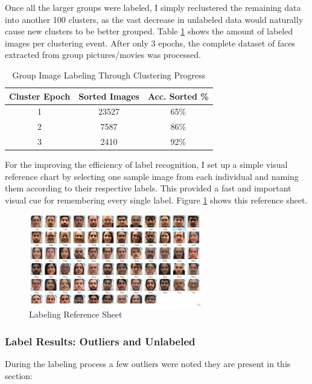 \documentclass[11pt]{article}
\begin{document}
        Once all the larger groups were labeled, I simply reclustered the remaining data into another 100 clusters, as the vast decrease in unlabeled data would naturally cause new clusters to be better grouped. Table \ref{table:cluster_passes} shows the amount of labeled images per clustering event. After only 3 epochs, the complete dataset of faces extracted from group pictures/movies was processed.

        \begin{table}[h!]
            \centering
            \begin{tabular}{||c c c||}
                \hline
                Cluster Epoch & Sorted Images & Acc. Sorted \% \\ [0.5ex]
                \hline\hline
                1 & 23527 &  65\% \\
                \hline
                2 & 7587 &  86\% \\
                \hline
                3 & 2410 & 92\% \\
                \hline
           \end{tabular}
           \caption{Group Image Labeling Through Clustering Progress}
            \label{table:cluster_passes}
        \end{table}

        For the improving the efficiency of label recognition, I set up a simple visual reference chart by selecting one sample image from each individual and naming them according to their respective labels. This provided a fast and important visual cue for remembering every single label. Figure \ref{fig:label:cheatsheet} shows this reference sheet.

        \begin{figure}[ht]
            \centering
            \includegraphics[height=4cm]{./Images/labeling/cheatsheet.png}
            \caption{Labeling Reference Sheet}
            \label{fig:label:cheatsheet}
        \end{figure}

    \subsubsection{Label Results: Outliers and Unlabeled}\label{sec:face_labeling:outliers}
        During the labeling process a few outliers were noted they are present in this section:
\end{document}
